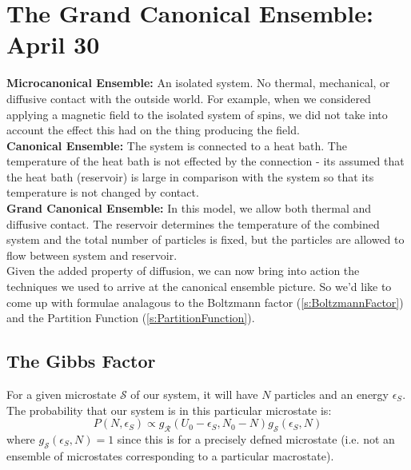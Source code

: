 \section{The Grand Canonical Ensemble: April 30}

\textbf{Microcanonical Ensemble:} An isolated system. No thermal, mechanical, or diffusive contact with the outside world. For example, when we considered applying a magnetic field to the isolated system of spins, we did not take into account the effect this had on the thing producing the field.\\

\textbf{Canonical Ensemble:} The system is connected to a heat bath. The temperature of the heat bath is not effected by the connection - its assumed that the heat bath (reservoir) is large in comparison with the system so that its temperature is not changed by contact.\\

\textbf{Grand Canonical Ensemble:} In this model, we allow both thermal and diffusive contact. The reservoir determines the temperature of the combined system and the total number of particles is fixed, but the particles are allowed to flow between system and reservoir.\\

Given the added property of diffusion, we can now bring into action the techniques we used to arrive at the canonical ensemble picture. So we'd like to come up with formulae analagous to the Boltzmann 
factor (\cref{s:BoltzmannFactor}) and the 
Partition Function (\cref{s:PartitionFunction}).\\

\subsection{The Gibbs Factor}
For a given microstate $\mathcal{S}$ of our system, it will have $N$ particles and an energy $\epsilon_S$. The probability that our system is in this particular microstate is:
\begin{equation}
P(N,\epsilon_S) \propto
g_{\mathcal{R}}(U_0-\epsilon_S, N_0-N) g_{\mathcal{S}}(\epsilon_S,N)
\label{eq:Pgrand1}
\end{equation}
where $g_{\mathcal{S}}(\epsilon_S,N) = 1$ since this is for a precisely
defned microstate (i.e. not an ensemble of microstates corresponding to a particular macrostate).

